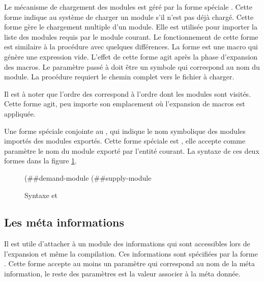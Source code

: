Le mécanisme de chargement des modules est géré par la forme spéciale
. Cette forme indique au système de charger un module
s'il n'est pas déjà chargé. Cette forme gère le chargement multiple d'un
module. Elle est utilisée pour importer la liste des modules requis par le
module courant.  Le fonctionnement de cette forme est similaire à la procédure
 avec quelques différences. La forme  est
une macro qui génère une expression vide. L'effet de cette forme agit après la
phase d'expansion des macros. Le paramètre passé à 
doit être un symbole qui correspond au nom du module. La procédure 
requiert le chemin complet vers le fichier à charger.

Il est à noter que l'ordre des  correspond à l'ordre
dont les modules sont visités. Cette forme agit, peu importe son emplacement
où l'expansion de macros est appliquée.



Une forme spéciale conjointe au , qui indique le nom
symbolique des modules importés des modules exportés. Cette forme spéciale est
, elle accepte comme paramètre le nom du module exporté
par l'entité courant.  La syntaxe de ces deux formes dans la figure
\ref{fig:syntax->demand/supply-module}.\\
\begin{figure}[ht]
  \centering
  \begin{mplisting}{0.8}
(##demand-module %
(##supply-module %
\end{mplisting}
  \caption{Syntaxe  et }
  \label{fig:syntax->demand/supply-module}
\end{figure}

\subsection{Les méta informations}
%
Il est utile d'attacher à un
module des informations qui sont accessibles lors de l'expansion
et même la compilation. Ces informations sont spécifiées par la forme
. Cette forme accepte au moins un paramètre qui
correspond au nom de la méta information, le reste des paramètres est la valeur
associer à la méta donnée.

